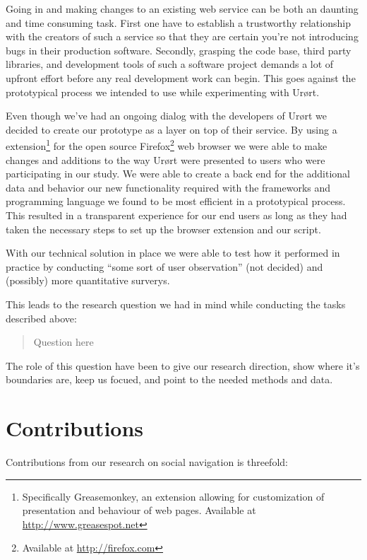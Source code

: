 Going in and making changes to an existing web service can be both an
daunting and time consuming task. First one have to establish a trustworthy
relationship with the creators of such a service so that they are certain
you're not introducing bugs in their production software. Secondly, grasping the
code base, third party libraries, and development tools of such a software
project demands a lot of upfront effort before any real development work can
begin. This goes against the prototypical process we intended to use while
experimenting with Ur\o{}rt.

Even though we've had an ongoing dialog with the developers of Ur\o{}rt we
decided to create our prototype as a layer on top of their service. By using a
extension\footnote{Specifically Greasemonkey, an extension allowing for
customization of presentation and behaviour of web pages. Available at
\url{http://www.greasespot.net}} for the open source
Firefox\footnote{Available at \url{http://firefox.com}}
web browser we were able to make changes and additions to the way Ur\o{}rt were
presented to users who were participating in our study. We were able to create
a back end for the additional data and behavior our new functionality required
with the frameworks and programming language we found to be most efficient in
a prototypical process. This resulted in a transparent experience for our end
users as long as they had taken the necessary steps to set up the browser
extension and our script.

With our technical solution in place we were able to test how it performed in
practice by conducting ``some sort of user observation'' (not decided) and
(possibly) more quantitative surverys.

This leads to the research question we had in mind while conducting
the tasks described above:

\begin{quote}
  Question here
\end{quote}

The role of this question have been to give our research direction, show where
it's boundaries are, keep us focued, and point to the needed methods and data.


\section{Contributions}

Contributions from our research on social navigation is threefold:

